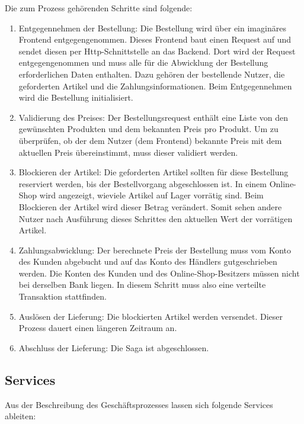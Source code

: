Die zum Prozess gehörenden Schritte sind folgende:
\begin{enumerate}
	\item Entgegennehmen der Bestellung: Die Bestellung wird über ein imaginäres Frontend entgegengenommen. Dieses Frontend baut einen Request auf und sendet diesen per Http-Schnittstelle an das Backend. Dort wird der Request entgegengenommen und muss alle für die Abwicklung der Bestellung erforderlichen Daten enthalten. Dazu gehören der bestellende Nutzer, die geforderten Artikel und die Zahlungsinformationen. Beim Entgegennehmen wird die Bestellung initialisiert.
	\item Validierung des Preises: Der Bestellungsrequest enthält eine Liste von den gewünschten Produkten und dem bekannten Preis pro Produkt. Um zu überprüfen, ob der dem Nutzer (dem Frontend) bekannte Preis mit dem aktuellen Preis übereinstimmt, muss dieser validiert werden. %
	\item Blockieren der Artikel: Die geforderten Artikel sollten für diese Bestellung reserviert werden, bis der Bestellvorgang abgeschlossen ist. In einem Online-Shop wird angezeigt, wieviele Artikel auf Lager vorrätig sind. Beim Blockieren der Artikel wird dieser Betrag verändert. Somit sehen andere Nutzer nach Ausführung dieses Schrittes den aktuellen Wert der vorrätigen Artikel. 
	\item Zahlungsabwicklung: Der berechnete Preis der Bestellung muss vom Konto des Kunden abgebucht und auf das Konto des Händlers gutgeschrieben werden. Die Konten des Kunden und des Online-Shop-Besitzers müssen nicht bei derselben Bank liegen. In diesem Schritt muss also eine verteilte Transaktion stattfinden.
	\item Auslösen der Lieferung: Die blockierten Artikel werden versendet. Dieser Prozess dauert einen längeren Zeitraum an.
	\item Abschluss der Lieferung: Die Saga ist abgeschlossen.
\end{enumerate}

\subsection{Services}
Aus der Beschreibung des Geschäftsprozesses lassen sich folgende Services ableiten:

